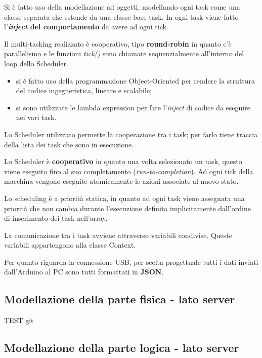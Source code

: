 Si è fatto uso della modellazione ad oggetti, modellando ogni task come una classe separata che estende da una classe base task. In ogni task viene fatto l'\textbf{\textit{inject} del comportamento} da avere ad ogni tick.

Il multi-tasking realizzato è cooperativo, tipo \textbf{round-robin} in quanto c'è parallelismo e le funzioni \textit{tick()} sono chiamate sequenzialmente all'interno del loop dello Scheduler.

\begin{itemize}	
	\item si è fatto uso della programmazione Object-Oriented per rendere la struttura del codice ingegneristica, lineare e scalabile;
	\item si sono utilizzate le lambda expression per fare l'\textit{inject} di codice da eseguire nei vari task.
\end{itemize}

Lo Scheduler utilizzato permette la cooperazione tra i task; per farlo tiene traccia della lista dei task che sono in esecuzione.

Lo Scheduler è \textbf{cooperativo} in quanto una volta selezionato un task, questo viene eseguito fino al suo completamento (\textit{run-to-completion}). Ad ogni tick della macchina vengono eseguite atomicamente le azioni associate al nuovo stato.

Lo scheduling è a priorità statica, in quanto ad ogni task viene assegnata una priorità che non cambia durante l'esecuzione definita implicitamente dall'ordine di inserimento dei task nell'array.

La comunicazione tra i task avviene attraverso variabili condivise. Queste variabili appartengono alla classe Context.

Per quanto riguarda la connessione USB, per scelta progettuale tutti i dati inviati dall'Arduino al PC sono tutti formattati in \textbf{JSON}.

\subsection{Modellazione della parte fisica - lato server}
TEST git
\subsection{Modellazione della parte logica - lato server}
